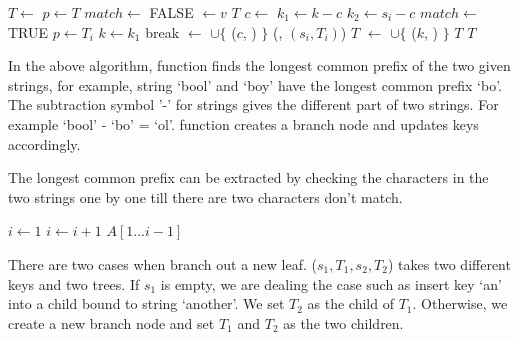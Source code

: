 \documentclass{article}
\begin{document}
\begin{algorithmic}[1]
   \State $T \gets$ 
  \EndIf
  \State $p \gets T$
  \Loop
    \State $match \gets$ FALSE
        \State {} $\gets v$
        \State \Return $T$
      \EndIf
      \State $c \gets$ 
      \State $k_1 \gets k - c$
      \State $k_2 \gets s_i - c$
        \State $match \gets$ TRUE
         
          \State $p \gets T_i$
          \State $k \gets k_1$
          \State break
        \Else {}
          \State {} $\gets$  $\cup \{$ ($c$, ) $\}$
          \State {}(, $(s_i, T_i)$)
          \State \Return $T$
        \EndIf
      \EndIf
    \EndFor
     
      \State {} $\gets$  $\cup \{$ ($k$, ) $\}$
      \State \Return $T$
    \EndIf
  \EndLoop
  \State \Return $T$
\EndFunction
\end{algorithmic}

In the above algorithm,  function finds the longest
common prefix of the two given strings, for example, string `bool' and `boy'
have the longest common prefix `bo'. The subtraction symbol '-' for
strings gives the different part of two strings. For example `bool' - `bo' = `ol'.  function creates a branch node
and updates keys accordingly.

The longest common prefix can be extracted by checking the characters in the two
strings one by one till there are two characters don't match.

\begin{algorithmic}[1]
  \State $i \gets 1 $
    \State $i \gets i + 1$
  \EndWhile
  \State \Return $A[1...i-1]$
\EndFunction
\end{algorithmic}

There are two cases when branch out a new leaf. ($s_1, T_1, s_2, T_2$)
takes two different keys and two trees. If $s_1$ is empty, we are
dealing the case such as insert key `an' into a child bound to
string `another'. We set $T_2$ as the child of $T_1$. Otherwise,
we create a new branch node and set $T_1$ and $T_2$ as the two children.
\end{document}
